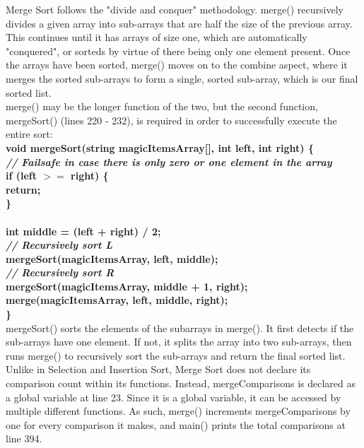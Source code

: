 \documentclass{article}
\begin{document}
Merge Sort follows the "divide and conquer" methodology. merge() recursively divides a given array into sub-arrays that are half the size of the previous array. This continues until it has arrays of size one, which are automatically "conquered", or sorteds by virtue of there being only one element present. Once the arrays have been sorted, merge() moves on to the combine aspect, where it merges the sorted sub-arrays to form a single, sorted sub-array, which is our final sorted list.\\
merge() may be the longer function of the two, but the second function, mergeSort() (lines 220 - 232), is required in order to successfully execute the entire sort:\\

\textbf{
void mergeSort(string magicItemsArray[], int left, int right) \{\\
    \textit{\indent // Failsafe in case there is only zero or one element in the array\\}
    \indent if (left $>=$ right) \{\\
        \indent \indent return;\\
    \indent \}\\
\\
    \indent int middle = (left + right) / 2;\\
    \textit{\indent // Recursively sort L\\}
    \indent mergeSort(magicItemsArray, left, middle);\\
    \textit{\indent // Recursively sort R\\}
    \indent mergeSort(magicItemsArray, middle + 1, right);\\
    \indent merge(magicItemsArray, left, middle, right);\\
\} }\\

mergeSort() sorts the elements of the subarrays in merge(). It first detects if the sub-arrays have one element. If not, it splits the array into two sub-arrays, then runs merge() to recursively sort the sub-arrays and return the final sorted list.\\
Unlike in Selection and Insertion Sort, Merge Sort does not declare its comparison count within its functions. Instead, mergeComparisons is declared as a global variable at line 23. Since it is a global variable, it can be accessed by multiple different functions. As such, merge() increments mergeComparisons by one for every comparison it makes, and main() prints the total comparisons at line 394. \\
\end{document}
